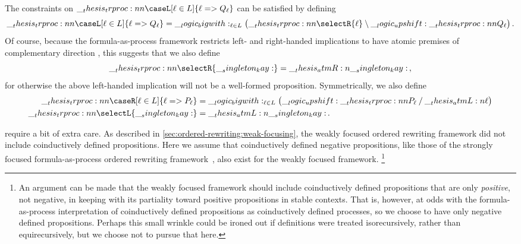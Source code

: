The constraints on $\trproc{\caseL[\ell \in L]{\ell => Q_{\ell}}}$ can be satisfied by defining
\begin{gather*}
  \trproc{\caseL[\ell \in L]{\ell => Q_{\ell}}}
    = \bigwith_{\ell \in L}\bigl(\trproc{\selectR{\ell}} \limp \up \trproc{Q_{\ell}}\bigr)
  \,.
\end{gather*}
Of course, because the formula-as-process framework restricts left- and right-handed implications to have atomic premises of complementary direction , this suggests that we also define
\begin{equation*}
  \trproc{\selectR{\kay}} = \atmR{\kay}
  \,,
\end{equation*}
for otherwise the above left-handed implication will not be a well-formed proposition.
Symmetrically, we also define 
\begin{align*}
  \trproc{\caseR[\ell \in L]{\ell => P_{\ell}}} &= \bigwith_{\ell \in L}\bigl(\up \trproc{P_{\ell}} \pmir \atmL{\ell}\bigr) \\
  \trproc{\selectL{\kay}} &= \atmL{\kay}
  \,.
\end{align*}

 require a bit of extra care.
As described in \cref{sec:ordered-rewriting:weak-focusing}, the weakly focused ordered rewriting framework did not include coinductively defined propositions.
Here we assume that coinductively defined negative propositions, like those of the strongly focused formula-as-process ordered rewriting framework~, also exist for the weakly focused framework.%
\footnote{An argument can be made that the weakly focused framework should include coinductively defined propositions that are only \emph{positive}, not negative, in keeping with its partiality toward positive propositions in stable contexts.
  That is, however, at odds with the formula-as-process interpretation of coinductively defined propositions as coinductively defined processes, so we choose to have only negative defined propositions.
  Perhaps this small wrinkle could be ironed out if definitions were treated iso\-re\-cur\-sive\-ly, rather than equi\-re\-cur\-sive\-ly, but we choose not to pursue that here.}

